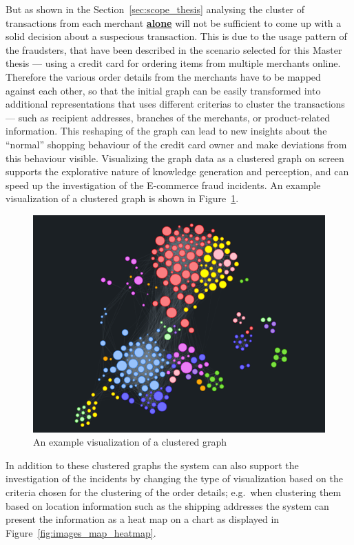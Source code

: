But as shown in the Section~\ref{sec:scope_thesis} analysing the cluster of transactions from each merchant \textbf{\underline{alone}} will not be sufficient to come up with a solid decision about a suspecious transaction. This is due to the usage pattern of the fraudsters, that have been described in the scenario selected for this Master thesis --- using a credit card for ordering items from multiple merchants online. Therefore the various order details from the merchants have to be mapped against each other, so that the initial graph can be easily transformed into additional representations that uses different criterias to cluster the transactions --- such as recipient addresses, branches of the merchants, or product-related information. This reshaping of the graph can lead to new insights about the ``normal'' shopping behaviour of the credit card owner and make deviations from this behaviour visible. Visualizing the graph data as a clustered graph on screen supports the explorative nature of knowledge generation and perception, and can speed up the investigation of the E-commerce fraud incidents. An example visualization of a clustered graph is shown in Figure~\ref{fig:images_graph_viz}. \@

\begin{figure}[H]
  \centering
  \includegraphics[width=0.9\columnwidth]{images/GraphViz.png}
  \caption{An example visualization of a clustered graph \citep{visjsshowcase}}
\label{fig:images_graph_viz}
\end{figure}

 In addition to these clustered graphs the system can also support the investigation of the incidents by changing the type of visualization based on the criteria chosen for the clustering of the order details; e.g.\ when clustering them based on location information such as the shipping addresses the system can present the information as a heat map on a chart as displayed in Figure~\ref{fig:images_map_heatmap}. \@

